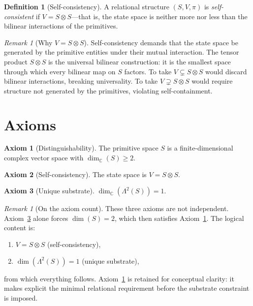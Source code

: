 \documentclass[11pt,a4paper]{article}
\theoremstyle{definition}
\newtheorem{definition}[theorem]{Definition}
\newtheorem{axiom}{Axiom}
\theoremstyle{remark}
\newtheorem{remark}[theorem]{Remark}
\newcommand{\C}{\mathbb{C}}
\begin{document}
\begin{definition}[Self-consistency]\label{def:selfconsist}
A relational structure $(S,V,\pi)$ is \emph{self-consistent} if
$V=S\otimes S$---that is, the state space is neither more nor less than
the bilinear interactions of the primitives.
\end{definition}

\begin{remark}[Why $V=S\otimes S$]\label{rem:why_tensor}
Self-consistency demands that the state space be generated by the
primitive entities under their mutual interaction.
The tensor product $S\otimes S$ is the universal bilinear construction:
it is the smallest space through which every bilinear map on $S$ factors.
To take $V\subsetneq S\otimes S$ would discard bilinear interactions,
breaking universality.
To take $V\supsetneq S\otimes S$ would require structure not generated
by the primitives, violating self-containment.
\end{remark}

\section{Axioms}\label{sec:axioms}

\begin{axiom}[Distinguishability]\label{ax:distinguish}
The primitive space $S$ is a finite-dimensional complex vector space with
$\dim_\C(S)\geq 2$.
\end{axiom}

\begin{axiom}[Self-consistency]\label{ax:selfconsist}
The state space is $V=S\otimes S$.
\end{axiom}

\begin{axiom}[Unique substrate]\label{ax:substrate}
$\dim_\C(\Lambda^2(S))=1$.
\end{axiom}

\begin{remark}[On the axiom count]\label{rem:axiom_count}
These three axioms are not independent.
Axiom~\ref{ax:substrate} alone forces $\dim(S)=2$, which then satisfies
Axiom~\ref{ax:distinguish}.
The logical content is:
\begin{enumerate}[nosep]
\item $V=S\otimes S$ (self-consistency),
\item $\dim(\Lambda^2(S))=1$ (unique substrate),
\end{enumerate}
from which everything follows.
Axiom~\ref{ax:distinguish} is retained for conceptual clarity: it makes
explicit the minimal relational requirement before the substrate
constraint is imposed.
\end{remark}
\end{document}
